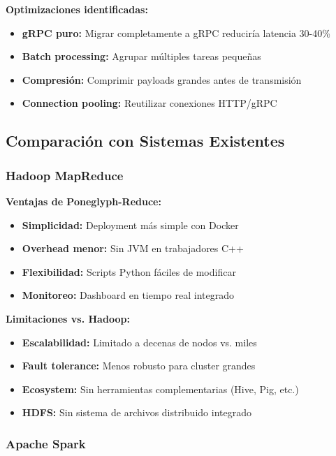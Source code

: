 \textbf{Optimizaciones identificadas:}
\begin{itemize}
    \item \textbf{gRPC puro:} Migrar completamente a gRPC reduciría latencia 30-40\%
    \item \textbf{Batch processing:} Agrupar múltiples tareas pequeñas
    \item \textbf{Compresión:} Comprimir payloads grandes antes de transmisión
    \item \textbf{Connection pooling:} Reutilizar conexiones HTTP/gRPC
\end{itemize}

\subsection{Comparación con Sistemas Existentes}

\subsubsection{Hadoop MapReduce}

\textbf{Ventajas de Poneglyph-Reduce:}
\begin{itemize}
    \item \textbf{Simplicidad:} Deployment más simple con Docker
    \item \textbf{Overhead menor:} Sin JVM en trabajadores C++
    \item \textbf{Flexibilidad:} Scripts Python fáciles de modificar
    \item \textbf{Monitoreo:} Dashboard en tiempo real integrado
\end{itemize}

\textbf{Limitaciones vs. Hadoop:}
\begin{itemize}
    \item \textbf{Escalabilidad:} Limitado a decenas de nodos vs. miles
    \item \textbf{Fault tolerance:} Menos robusto para cluster grandes
    \item \textbf{Ecosystem:} Sin herramientas complementarias (Hive, Pig, etc.)
    \item \textbf{HDFS:} Sin sistema de archivos distribuido integrado
\end{itemize}

\subsubsection{Apache Spark}

